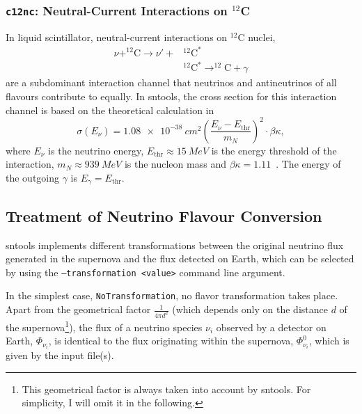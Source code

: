 \documentclass[11pt, oneside]{article}
\begin{document}
\subsubsection{\texttt{c12nc}: Neutral-Current Interactions on $^{12}$C}
In liquid scintillator, neutral-current interactions on $^{12}$C nuclei,
\begin{align}
\nu + ^{12}\text{C} \rightarrow \nu' + &^{12}\text{C}^*\\
	&^{12}\text{C}^* \rightarrow ^{12}\text{C} + \gamma
\end{align}
are a subdominant interaction channel that neutrinos and antineutrinos of all flavours contribute to equally.
In sntools, the cross section for this interaction channel is based on the theoretical calculation in~\cite{Donnelly1979}
\begin{equation}
\sigma (E_\nu) = \SI{1.08e-38}{cm^2} \left( \frac{E_\nu - E_\text{thr}}{m_N} \right)^2 \cdot \beta \kappa,
\end{equation}
where $E_\nu$ is the neutrino energy, $E_\text{thr} \approx \SI{15}{MeV}$ is the energy threshold of the interaction, $m_N \approx \SI{939}{MeV}$ is the nucleon mass and $\beta \kappa = 1.11$~\cite{Armbruster1998}.
The energy of the outgoing $\gamma$ is $E_\gamma = E_\text{thr}$.


\subsection{Treatment of Neutrino Flavour Conversion} \label{sec:transformation}

sntools implements different transformations between the original neutrino flux generated in the supernova and the flux detected on Earth, which can be selected by using the \texttt{--transformation <value>} command line argument.

In the simplest case, \texttt{NoTransformation}, no flavor transformation takes place. Apart from the geometrical factor $\frac{1}{4 \pi d^2}$ (which depends only on the distance $d$ of the supernova\footnote{This geometrical factor is always taken into account by sntools. For simplicity, I will omit it in the following.}), the flux of a neutrino species $\nu_i$ observed by a detector on Earth, $\Phi_{\nu_i}$, is identical to the flux originating within the supernova, $\Phi_{\nu_i}^0$, which is given by the input file(s).
\end{document}

